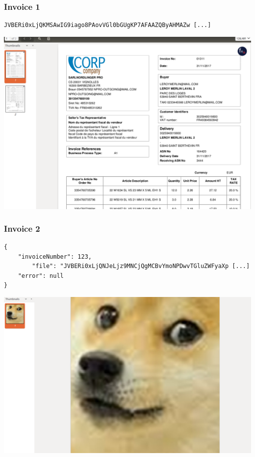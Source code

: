 \begin{frame}[fragile]
\frametitle{Invoice 1}
\begin{lstlisting}
JVBERi0xLjQKMSAwIG9iago8PAovVGl0bGUgKP7AFAAZQByAHMAZw [...]
\end{lstlisting}
\end{frame}

\begin{frame}
    \includegraphics[width=1.0\linewidth]{pics/invoice1.png}
\end{frame}

\begin{frame}[fragile]
\frametitle{Invoice 2}
\begin{lstlisting}
{
	"invoiceNumber": 123,
        "file": "JVBERi0xLjQNJeLjz9MNCjQgMCBvYmoNPDwvTGluZWFyaXp [...]
	"error": null
}
\end{lstlisting}
\end{frame}

\begin{frame}
    \includegraphics[width=1.0\linewidth]{pics/invoice2.png}
\end{frame}

